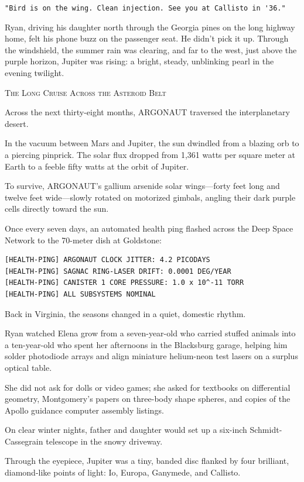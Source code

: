 \documentclass[12pt,twoside,openright]{book}
\newcommand{\sceneheader}[1]{%
  \par\vspace{1.8em}%
  {\noindent\centering\scshape\large #1\par}%
  \vspace{1.0em}%
  \noindent%
}
\newcommand{\dinkus}{%
  \par\vspace{1.2em}%
  {\noindent\centering{\large $\ast\quad\ast\quad\ast$}\par}%
  \vspace{1.2em}%
  \noindent%
}
\begin{document}
\passthrough{\lstinline!"Bird is on the wing. Clean injection. See you at Callisto in '36."!}

Ryan, driving his daughter north through the Georgia pines on the long
highway home, felt his phone buzz on the passenger seat. He didn't pick
it up. Through the windshield, the summer rain was clearing, and far to
the west, just above the purple horizon, Jupiter was rising: a bright,
steady, unblinking pearl in the evening twilight.

\dinkus

\sceneheader{The Long Cruise Across the Asteroid
Belt}

Across the next thirty-eight months, ARGONAUT traversed the
interplanetary desert.

In the vacuum between Mars and Jupiter, the sun dwindled from a blazing
orb to a piercing pinprick. The solar flux dropped from 1,361 watts per
square meter at Earth to a feeble fifty watts at the orbit of Jupiter.

To survive, ARGONAUT's gallium arsenide solar wings---forty feet long
and twelve feet wide---slowly rotated on motorized gimbals, angling
their dark purple cells directly toward the sun.

Once every seven days, an automated health ping flashed across the Deep
Space Network to the 70-meter dish at Goldstone:

\begin{lstlisting}
[HEALTH-PING] ARGONAUT CLOCK JITTER: 4.2 PICODAYS
[HEALTH-PING] SAGNAC RING-LASER DRIFT: 0.0001 DEG/YEAR
[HEALTH-PING] CANISTER 1 CORE PRESSURE: 1.0 x 10^-11 TORR
[HEALTH-PING] ALL SUBSYSTEMS NOMINAL
\end{lstlisting}

Back in Virginia, the seasons changed in a quiet, domestic rhythm.

Ryan watched Elena grow from a seven-year-old who carried stuffed
animals into a ten-year-old who spent her afternoons in the Blacksburg
garage, helping him solder photodiode arrays and align miniature
helium-neon test lasers on a surplus optical table.

She did not ask for dolls or video games; she asked for textbooks on
differential geometry, Montgomery's papers on three-body shape spheres,
and copies of the Apollo guidance computer assembly listings.

On clear winter nights, father and daughter would set up a six-inch
Schmidt-Cassegrain telescope in the snowy driveway.

Through the eyepiece, Jupiter was a tiny, banded disc flanked by four
brilliant, diamond-like points of light: Io, Europa, Ganymede, and
Callisto.
\end{document}
